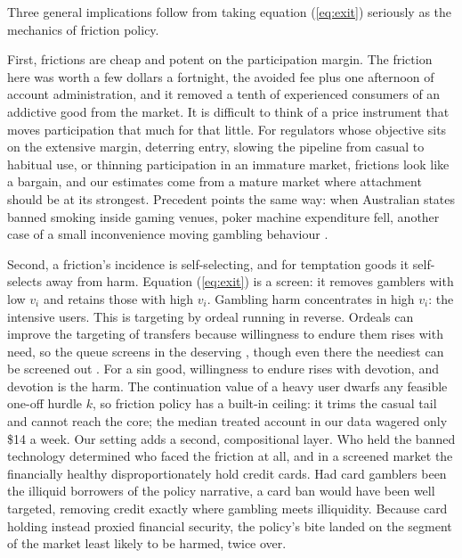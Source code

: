 \documentclass[11pt]{article}
\begin{document}
Three general implications follow from taking equation (\ref{eq:exit}) seriously as the mechanics of friction policy.

First, frictions are cheap and potent on the participation margin. The friction here was worth a few dollars a fortnight, the avoided fee plus one afternoon of account administration, and it removed a tenth of experienced consumers of an addictive good from the market. It is difficult to think of a price instrument that moves participation that much for that little. For regulators whose objective sits on the extensive margin, deterring entry, slowing the pipeline from casual to habitual use, or thinning participation in an immature market, frictions look like a bargain, and our estimates come from a mature market where attachment should be at its strongest. Precedent points the same way: when Australian states banned smoking inside gaming venues, poker machine expenditure fell, another case of a small inconvenience moving gambling behaviour \citep{productivity2010gambling}.

Second, a friction's incidence is self-selecting, and for temptation goods it self-selects away from harm. Equation (\ref{eq:exit}) is a screen: it removes gamblers with low $v_i$ and retains those with high $v_i$. Gambling harm concentrates in high $v_i$: the intensive users. This is targeting by ordeal running in reverse. Ordeals can improve the targeting of transfers because willingness to endure them rises with need, so the queue screens in the deserving \citep{NicholsZeckhauser1982, AlatasEtAl2016_SelfTargeting}, though even there the neediest can be screened out \citep{DeshpandeLi2019_ScreenedOut}. For a sin good, willingness to endure rises with devotion, and devotion is the harm. The continuation value of a heavy user dwarfs any feasible one-off hurdle $k$, so friction policy has a built-in ceiling: it trims the casual tail and cannot reach the core; the median treated account in our data wagered only \$14 a week. Our setting adds a second, compositional layer. Who held the banned technology determined who faced the friction at all, and in a screened market the financially healthy disproportionately hold credit cards. Had card gamblers been the illiquid borrowers of the policy narrative, a card ban would have been well targeted, removing credit exactly where gambling meets illiquidity. Because card holding instead proxied financial security, the policy's bite landed on the segment of the market least likely to be harmed, twice over.
\end{document}
